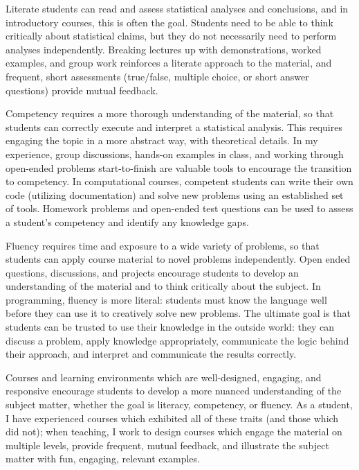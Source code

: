 \documentclass[12pt, letterpaper, sans]{moderncv}
\begin{document}
Literate students can read and assess statistical analyses and conclusions, and in introductory courses, this is often the goal. Students need to be able to think critically about statistical claims, but they do not necessarily need to perform analyses independently. Breaking lectures up with demonstrations, worked examples, and group work reinforces a literate approach to the material, and frequent, short assessments (true/false, multiple choice, or short answer questions) provide mutual feedback. 

Competency requires a more thorough understanding of the material, so that students can correctly execute and interpret a statistical analysis. This requires engaging the topic in a more abstract way, with theoretical details. In my experience, group discussions, hands-on examples in class, and working through open-ended problems start-to-finish are valuable tools to encourage the transition to competency. In computational courses, competent students can write their own code (utilizing documentation) and solve new problems using an established set of tools. Homework problems and open-ended test questions can be used to assess a student's competency and identify any knowledge gaps. 

Fluency requires time and exposure to a wide variety of problems, so that students can apply course material to novel problems independently. Open ended questions, discussions, and projects encourage students to develop an understanding of the material and to think critically about the subject. In programming, fluency is more literal: students must know the language well before they can use it to creatively solve new problems. The ultimate goal is that students can be trusted to use their knowledge in the outside world: they can discuss a problem, apply knowledge appropriately, communicate the logic behind their approach, and interpret and communicate the results correctly. 

Courses and learning environments which are well-designed, engaging, and responsive encourage students to develop a more nuanced understanding of the subject matter, whether the goal is literacy, competency, or fluency. As a student, I have experienced courses which exhibited all of these traits (and those which did not); when teaching, I work to design courses which engage the material on multiple levels, provide frequent, mutual feedback, and illustrate the subject matter with fun, engaging, relevant examples. 
\end{document}
